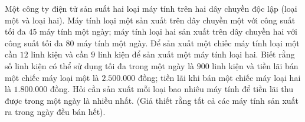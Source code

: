 \begin{bt}%
    Một công ty điện tử sản suất hai loại máy tính trên hai dây chuyền độc lập (loại một và loại hai). Máy tính loại một sản xuất trên dây chuyền một với công suất tối đa $45$ máy tính một ngày; máy tính loại hai sản xuất trên dây chuyền hai với công suất tối đa 80 máy tính một ngày. Để sản xuất một chiếc máy tính loại một cần $12$ linh kiện và cần $9$ linh kiện để sản xuất một máy tính loại hai. Biết rằng số linh kiện có thể sử dụng tối đa trong một ngày là $900$ linh kiện và tiền lãi bán một chiếc máy loại một là
    $2.500.000$ đồng; tiền lãi khi bán một chiếc máy loại hai là $1.800.000$ đồng. Hỏi cần sản xuất mỗi loại bao nhiêu máy tính để tiền lãi thu được trong một ngày là nhiều nhất. (Giả thiết rằng tất cả các máy tính sản xuất ra trong ngày đều bán
    hết).
\end{bt}

